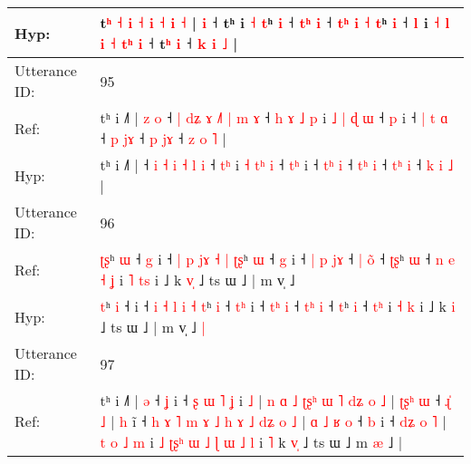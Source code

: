 \documentclass[10pt]{article}
\DeclareRobustCommand{\hl}[1]{{\textcolor{red}{#1}}}
\begin{document}
\begin{longtable}{ll}
 \\
Hyp: & t\hl{}\hl{ʰ} \hl{˧} \hl{i} \hl{˧} \hl{i} \hl{˧} \hl{}\hl{i} \hl{˧} |\hl{}\hl{} \hl{i} ˧ tʰ i\hl{}\hl{}\hl{}\hl{}\hl{}\hl{}\hl{}\hl{}\hl{}\hl{}\hl{}\hl{}\hl{}\hl{} \hl{˧} \hl{t}ʰ \hl{}\hl{i} ˧ \hl{t}\hl{ʰ}\hl{ }\hl{i} ˧ \hl{}\hl{t}\hl{ʰ} \hl{i} \hl{˧} \hl{t}ʰ \hl{}\hl{i} ˧\hl{}\hl{}\hl{}\hl{}\hl{}\hl{} \hl{l} i \hl{˧} \hl{l} \hl{i} \hl{˧} \hl{}\hl{t}\hl{ʰ} \hl{i} ˧ t\hl{ʰ} \hl{i} ˧ \hl{k}\hl{ }\hl{i} \hl{˩} |
 \\
\midrule
Utterance ID: & 95 \\
Ref: & tʰ i ˩˥ |\hl{ }\hl{z}\hl{ }\hl{o} ˧\hl{ }\hl{|} \hl{d}\hl{ʑ} \hl{ɤ} \hl{˩}\hl{˥} \hl{|} \hl{m} \hl{ɤ} ˧\hl{ }\hl{h}\hl{ }\hl{ɤ} \hl{˩}\hl{ }\hl{p} i \hl{˩} \hl{|}\hl{ }\hl{ɖ} \hl{ɯ} ˧ \hl{}\hl{p} i ˧ \hl{|}\hl{ }\hl{t} \hl{ɑ} ˧ \hl{p}\hl{ }\hl{j}\hl{ɤ} ˧ \hl{p}\hl{ }\hl{j}\hl{ɤ} ˧ \hl{z} \hl{o} \hl{˥} |
 \\
Hyp: & tʰ i ˩˥ |\hl{}\hl{}\hl{}\hl{} ˧\hl{}\hl{} \hl{}\hl{i} \hl{˧} \hl{}\hl{i} \hl{˧} \hl{l} \hl{i} ˧\hl{}\hl{}\hl{}\hl{} \hl{}\hl{t}\hl{ʰ} i \hl{˧} \hl{}\hl{t}\hl{ʰ} \hl{i} ˧ \hl{t}\hl{ʰ} i ˧ \hl{}\hl{t}\hl{ʰ} \hl{i} ˧ \hl{t}\hl{ʰ}\hl{ }\hl{i} ˧ \hl{t}\hl{ʰ}\hl{ }\hl{i} ˧ \hl{k} \hl{i} \hl{˩} |
 \\
\midrule
Utterance ID: & 96 \\
Ref: & \hl{ʈ}\hl{ʂ}ʰ \hl{ɯ} ˧\hl{ }\hl{g} i ˧ \hl{|} \hl{p} \hl{j}\hl{ɤ} \hl{˧} \hl{|} \hl{ʈ}\hl{ʂ}ʰ \hl{ɯ} ˧ \hl{}\hl{g} i ˧ \hl{|}\hl{ }\hl{p} \hl{j}\hl{ɤ} ˧ \hl{|}\hl{ }\hl{o}\hl{̃} ˧ \hl{ʈ}\hl{ʂ}ʰ \hl{ɯ} ˧\hl{ }\hl{n}\hl{ }\hl{e} \hl{˧}\hl{ }\hl{ʝ} i \hl{˥} \hl{t}\hl{s} i ˩ k \hl{v}\hl{̩} ˩ ts ɯ ˩ | m v̩ ˩\hl{}\hl{}
 \\
Hyp: & \hl{}\hl{t}ʰ \hl{i} ˧\hl{}\hl{} i ˧ \hl{i} \hl{˧} \hl{}\hl{l} \hl{i} \hl{˧} \hl{}\hl{t}ʰ \hl{i} ˧ \hl{t}\hl{ʰ} i ˧ \hl{}\hl{t}\hl{ʰ} \hl{}\hl{i} ˧ \hl{t}\hl{ʰ}\hl{ }\hl{i} ˧ \hl{}\hl{t}ʰ \hl{i} ˧\hl{}\hl{}\hl{}\hl{} \hl{}\hl{t}\hl{ʰ} i \hl{˧} \hl{}\hl{k} i ˩ k \hl{}\hl{i} ˩ ts ɯ ˩ | m v̩ ˩\hl{ }\hl{|}
 \\
\midrule
Utterance ID: & 97 \\
Ref: & tʰ i ˩˥ |\hl{ }\hl{ə} ˧\hl{ }\hl{ʝ} i ˧\hl{ }\hl{ʂ}\hl{ }\hl{ɯ} \hl{˥} \hl{ʝ} i \hl{˩} |\hl{ }\hl{n} \hl{ɑ} \hl{˩} \hl{ʈ}\hl{ʂ}\hl{ʰ} \hl{ɯ} \hl{˥} \hl{d}\hl{ʑ} \hl{o} \hl{˩} |\hl{ }\hl{ʈ}\hl{ʂ}\hl{ʰ} \hl{ɯ} ˧\hl{ }\hl{ɻ}\hl{̍}\hl{ }\hl{˩} |\hl{ }\hl{h} i\hl{̃} ˧ \hl{h} \hl{ɤ} \hl{˥} \hl{m} \hl{ɤ} \hl{˩} \hl{h} \hl{ɤ} \hl{˩} \hl{d}\hl{ʑ} \hl{o} \hl{˩} | \hl{ɑ} \hl{˩} \hl{ʁ} \hl{o} ˧ \hl{b} i ˧ \hl{d}\hl{ʑ} \hl{o} \hl{˥} |\hl{ }\hl{t} \hl{o} \hl{˩} \hl{m} i \hl{˩} \hl{ʈ}\hl{ʂ}\hl{ʰ} \hl{ɯ} \hl{˩} \hl{ɭ} \hl{ɯ} \hl{˩} \hl{l} i \hl{˥} k \hl{v}\hl{̩} ˩ ts ɯ ˩\hl{}\hl{} m \hl{}\hl{æ} ˩ |

\end{longtable}
\end{document}
